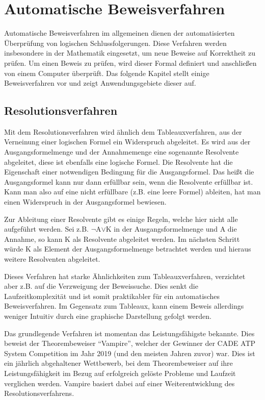 
\chapter{Automatische Beweisverfahren}
Automatische Beweisverfahren im allgemeinen dienen der automatisierten Überprüfung von logischen Schlussfolgerungen. Diese Verfahren werden insbesondere in der Mathematik eingesetzt, um neue Beweise auf Korrektheit zu prüfen. Um einen Beweis zu prüfen, wird dieser Formal definiert und anschließen von einem Computer überprüft. Das folgende Kapitel stellt einige Beweisverfahren vor und zeigt Anwendungsgebiete dieser auf.

\section{Resolutionsverfahren}
Mit dem Resolutionsverfahren wird ähnlich dem Tableauxverfahren, aus der Verneinung einer logischen Formel ein Widerspruch abgeleitet. Es wird aus der Ausgangsformelmenge und der Annahmemenge eine sogenannte Resolvente abgeleitet, diese ist ebenfalls eine logische Formel. Die Resolvente hat die Eigenschaft einer notwendigen Bedingung für die Ausgangsformel. Das heißt die Ausgangsformel kann nur dann erfüllbar sein, wenn die Resolvente erfüllbar ist. Kann man also auf eine nicht erfüllbare (z.B. eine leere Formel) ableiten, hat man einen Widerspruch in der Ausgangsformel bewiesen. \cite{RN16}

Zur Ableitung einer Resolvente gibt es einige Regeln, welche hier nicht alle aufgeführt werden. Sei z.B. $\neg$A$\vee$K in der Ausgangsformelmenge und A die Annahme, so kann K als Resolvente abgeleitet werden. Im nächsten Schritt würde K als Element der Ausgangsformelmenge betrachtet werden und hieraus weitere Resolventen abgeleitet. \cite{RN16}

Dieses Verfahren hat starke Ähnlichkeiten zum Tableauxverfahren, verzichtet aber z.B. auf die Verzweigung der Beweissuche. Dies senkt die Laufzeitkomplexität und ist somit praktikabler für ein automatisches Beweisverfahren. Im Gegensatz zum Tableaux, kann einem Beweis allerdings weniger Intuitiv durch eine graphische Darstellung gefolgt werden.

Das grundlegende Verfahren ist momentan das Leistungsfähigste bekannte. Dies beweist der Theorembeweiser ``Vampire'', welcher der Gewinner der CADE ATP System Competition im Jahr 2019 (und den meisten Jahren zuvor) war. Dies ist ein jährlich abgehaltener Wettbewerb, bei dem Theorembeweiser auf ihre Leistungsfähigkeit im Bezug auf erfolgreich gelöste Probleme und Laufzeit verglichen werden. \cite{casc_atp_comp} Vampire basiert dabei auf einer Weiterentwicklung des Resolutionsverfahrens.

